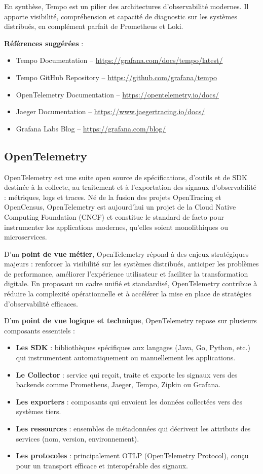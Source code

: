 En synthèse, Tempo est un pilier des architectures d’observabilité modernes. Il apporte visibilité, compréhension et capacité de diagnostic sur les systèmes distribués, en complément parfait de Prometheus et Loki.

\textbf{Références suggérées} :
\begin{itemize}
	\item Tempo Documentation – \url{https://grafana.com/docs/tempo/latest/}
	\item Tempo GitHub Repository – \url{https://github.com/grafana/tempo}
	\item OpenTelemetry Documentation – \url{https://opentelemetry.io/docs/}
	\item Jaeger Documentation – \url{https://www.jaegertracing.io/docs/}
	\item Grafana Labs Blog – \url{https://grafana.com/blog/}
\end{itemize}


\subsection{OpenTelemetry}

OpenTelemetry est une suite open source de spécifications, d’outils et de SDK destinée à la collecte, au traitement et à l’exportation des signaux d’observabilité  : métriques, logs et traces. Né de la fusion des projets OpenTracing et OpenCensus, OpenTelemetry est aujourd’hui un projet de la Cloud Native Computing Foundation (CNCF) et constitue le standard de facto pour instrumenter les applications modernes, qu’elles soient monolithiques ou microservices.

D’un \textbf{point de vue métier}, OpenTelemetry répond à des enjeux stratégiques majeurs  : renforcer la visibilité sur les systèmes distribués, anticiper les problèmes de performance, améliorer l’expérience utilisateur et faciliter la transformation digitale. En proposant un cadre unifié et standardisé, OpenTelemetry contribue à réduire la complexité opérationnelle et à accélérer la mise en place de stratégies d’observabilité efficaces.

D’un \textbf{point de vue logique et technique}, OpenTelemetry repose sur plusieurs composants essentiels  :
\begin{itemize}
	\item \textbf{Les SDK}  : bibliothèques spécifiques aux langages (Java, Go, Python, etc.) qui instrumentent automatiquement ou manuellement les applications.
	\item \textbf{Le Collector}  : service qui reçoit, traite et exporte les signaux vers des backends comme Prometheus, Jaeger, Tempo, Zipkin ou Grafana.
	\item \textbf{Les exporters}  : composants qui envoient les données collectées vers des systèmes tiers.
	\item \textbf{Les ressources}  : ensembles de métadonnées qui décrivent les attributs des services (nom, version, environnement).
	\item \textbf{Les protocoles}  : principalement OTLP (OpenTelemetry Protocol), conçu pour un transport efficace et interopérable des signaux.
\end{itemize}

